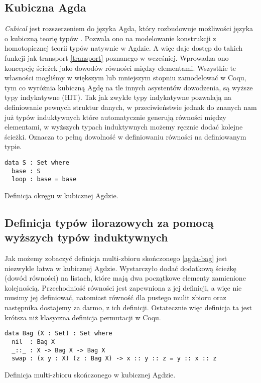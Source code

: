 \subsection{Kubiczna Agda}
\emph{Cubical} jest rozszerzeniem do języka Agda, który rozbudowuje możliwości języka o kubiczną teorię typów \cite{cubical}. Pozwala ono na modelowanie konstrukcji z homotopicznej teorii typów natywnie w Agdzie. A więc daje dostęp do takich funkcji jak transport \ref{transport} poznanego w wcześniej. Wprowadza ono koncepcję ścieżek jako dowodów równości między elementami. Wszystkie te własności mogliśmy w większym lub mniejszym stopniu zamodelować w Coqu, tym co wyróżnia kubiczną Agdę na tle innych asystentów dowodzenia, są wyższe typy indykatywne (HIT). Tak jak zwykłe typy indykatywne pozwalają na definiowanie pewnych struktur danych, w przeciwieństwie jednak do znanych nam już typów induktywnych które automatycznie generują równości między elementami, w wyższych typach induktywnych możemy ręcznie dodać kolejne ścieżki. Oznacza to pełną dowolność w definiowaniu równości na definiowanym typie.
\begin{code}
\begin{verbatim}
data S : Set where
  base : S
  loop : base = base
\end{verbatim}
\caption{Definicja okręgu w kubicznej Agdzie.}
\label{agda-bag}
\end{code}
\subsection{Definicja typów ilorazowych za pomocą wyższych typów induktywnych}
Jak możemy zobaczyć definicja multi-zbioru skończonego \ref{agda-bag} jest niezwykle łatwa w kubicznej Agdzie. Wystarczyło dodać dodatkową ścieżkę (dowód równości) na listach, które mają dwa początkowe elementy zamienione kolejnością. Przechodniość równości jest zapewniona z jej definicji, a więc nie musimy jej definiować, natomiast równość dla pustego mulit zbioru oraz następnika dostajemy za darmo, z ich definicji. Ostatecznie więc definicja ta jest krótsza niż klasyczna definicja permutacji w Coqu.
\begin{code}
\begin{verbatim}
data Bag (X : Set) : Set where
  nil  : Bag X
  _::_ : X -> Bag X -> Bag X
  swap : (x y : X) (z : Bag X) -> x :: y :: z = y :: x :: z
\end{verbatim}
\caption{Definicja multi-zbioru skończonego w kubicznej Agdzie.}
\label{agda-bag}
\end{code}

